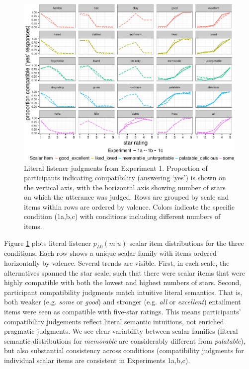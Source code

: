 \documentclass[10pt, letterpaper]{article}
\newenvironment{CodeChunk}{}{}
\begin{document}
\begin{CodeChunk}
\begin{figure}[t]

{\centering \includegraphics{figs/exp1Plots-1} 

}

\caption[Literal listener judgments from Experiment 1]{Literal listener judgments from Experiment 1. Proportion of participants indicating compatibility (answering `yes') is shown on the vertical axis, with the horizontal axis showing number of stars on which the utterance was judged. Rows are grouped by scale and items within rows are ordered by valence. Colors indicate the specific condition (1a,b,c) with conditions including different numbers of items.}\label{fig:exp1Plots}
\end{figure}
\end{CodeChunk}

Figure \ref{fig:exp1Plots} plots literal listener \(p_{L0}(m|u)\) scalar
item distributions for the three conditions. Each row shows a unique
scalar family with items ordered horizontally by valence. Several trends
are visible. First, in each scale, the alternatives spanned the star
scale, such that there were scalar items that were highly compatible
with both the lowest and highest numbers of stars. Second, participant
compatibility judgments match intuitive literal semantics. That is, both
weaker (e.g. \emph{some} or \emph{good}) and stronger (e.g. \emph{all}
or \emph{excellent}) entailment items were seen as compatible with
five-star ratings. This means participants' compatibility judgements
reflect literal semantic intuitions, not enriched pragmatic judgments.
We see clear variability between scalar families (literal semantic
distributions for \emph{memorable} are considerably different from
\emph{palatable}), but also substantial consistency across conditions
(compatibility judgments for individual scalar items are consistent in
Experiments 1a,b,c).
\end{document}
